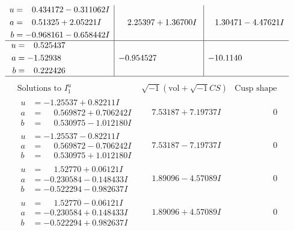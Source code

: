 \documentclass[1p]{elsarticle_modified}
\theoremstyle{definition}
\newcommand{\I}{\sqrt{-1}}
\begin{document}
$$\begin{array}{c|c|c}
\begin{aligned}
u &= \phantom{-}0.434172 - 0.311062 I \\
a &= \phantom{-}0.51325 + 2.05221 I \\
b &= -0.968161 - 0.658442 I\end{aligned}
 & \phantom{-}2.25397 + 1.36700 I & \phantom{-}1.30471 - 4.47621 I \\ \hline\begin{aligned}
u &= \phantom{-}0.525437\phantom{ +0.000000I} \\
a &= -1.52938\phantom{ +0.000000I} \\
b &= \phantom{-}0.222426\phantom{ +0.000000I}\end{aligned}
 & -0.954527\phantom{ +0.000000I} & -10.1140\phantom{ +0.000000I}\\
 \hline 
 \end{array}$$\newpage$$\begin{array}{c|c|c}  
\text{Solutions to }I^u_{1}& \I (\text{vol} + \sqrt{-1}CS) & \text{Cusp shape}\\
 \hline 
\begin{aligned}
u &= -1.25537 + 0.82211 I \\
a &= \phantom{-}0.569872 + 0.706242 I \\
b &= \phantom{-}0.530975 - 1.012180 I\end{aligned}
 & \phantom{-}7.53187 + 7.19737 I & \phantom{-0.000000 } 0 \\ \hline\begin{aligned}
u &= -1.25537 - 0.82211 I \\
a &= \phantom{-}0.569872 - 0.706242 I \\
b &= \phantom{-}0.530975 + 1.012180 I\end{aligned}
 & \phantom{-}7.53187 - 7.19737 I & \phantom{-0.000000 } 0 \\ \hline\begin{aligned}
u &= \phantom{-}1.52770 + 0.06121 I \\
a &= -0.230584 - 0.148433 I \\
b &= -0.522294 - 0.982637 I\end{aligned}
 & \phantom{-}1.89096 - 4.57089 I & \phantom{-0.000000 } 0 \\ \hline\begin{aligned}
u &= \phantom{-}1.52770 - 0.06121 I \\
a &= -0.230584 + 0.148433 I \\
b &= -0.522294 + 0.982637 I\end{aligned}
 & \phantom{-}1.89096 + 4.57089 I & \phantom{-0.000000 } 0 \\ \hline\begin{aligned}

\end{aligned}
\end{array}$$
\end{document}
